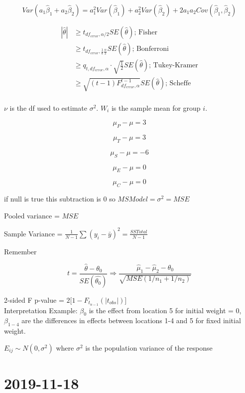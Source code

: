\documentclass[]{article}
\begin{document}
$$
Var(a_1 \hat{\beta}_1 + a_2 \hat{\beta}_2) =
a_1^2 Var(\hat{\beta}_1) + a_2^2 Var(\hat{\beta}_2) + 2 a_1 a_2 Cov(\hat{\beta}_1, \hat{\beta}_2)
$$


\begin{align*}
	| \hat{\theta} | & \geq t_{df_{error}, \alpha / 2} SE(\hat{\theta}) \text{; Fisher} \\
		& \geq t_{df_{error}, \frac{ 1 }{ k } \frac{ \alpha }{ 2 }} SE(\hat{\theta}) \text{; Bonferroni}\\
		& \geq q_{t, df_{error} , \alpha } \cdot \sqrt{ \frac{ 1 }{  2 }} SE(\hat{\theta}) \text{; Tukey-Kramer} \\
		& \geq \sqrt{(t-1) F^{t-1}_{df_{error}, \alpha }} SE(\hat{\theta}) \text{; Scheffe}\\
\end{align*}

$\nu$ is the df used to estimate $\sigma^2$. 
$W_i$ is the sample mean for group $i$.


$$\mu_P - \mu = 3$$

$$\mu_T - \mu = 3$$

$$\mu_S - \mu = -6$$

$$\mu_E - \mu = 0$$

$$\mu_C - \mu = 0$$


if null is true this subtraction is 0 so $MSModel = \sigma^2 = MSE$

Pooled variance = $MSE$

Sample Variance = $\frac{ 1 }{ N-1 } \sum (y_i - \bar{y})^2 = \frac{ SSTotal }{ N-1 }$


Remember 

$$
t = \frac{ \hat{\theta} - \theta_0 }{ SE( \hat{\theta_0})  } \Rightarrow \frac{ \hat{\mu}_1 - \hat{\mu}_2 - \theta_0 }{ \sqrt{MSE ( 1/n_1 + 1/n_2)} }
$$


2-sided F p-value = $2 \Big[ 1 - F_{t_{n-1}}( |t_{obs}| ) \Big]$\\



\noindent
Interpretation Example: $\beta_0$ is the effect from location 5 for initial weight = 0, $\beta_{1-4}$ are the differences in effects between locations 1-4 and 5 for fixed initial weight.



$E_{ij} \sim N(0,\sigma^2)$ where $\sigma^2$ is the population variance of the response


\section*{2019-11-18}
\end{document}
